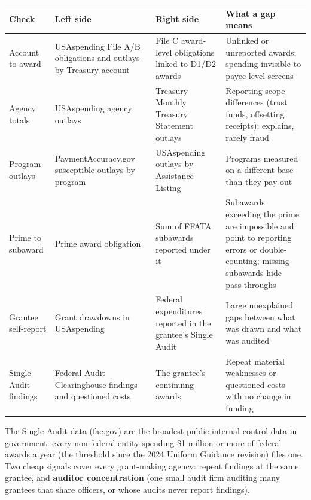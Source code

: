 \documentclass[letterpaper,11pt]{article}
\begin{document}
\begingroup\small\setlength{\tabcolsep}{4pt}\renewcommand{\arraystretch}{1.25}
\begin{longtable}[l]{@{}>{\raggedright\arraybackslash}p{}>{\raggedright\arraybackslash}p{}>{\raggedright\arraybackslash}p{}>{\raggedright\arraybackslash}p{}@{}}
\rowcolor{coolblack}\leavevmode\color{white}\bfseries Check & \leavevmode\color{white}\bfseries Left side & \leavevmode\color{white}\bfseries Right side & \leavevmode\color{white}\bfseries What a gap means \\
\endhead
Account to award & USAspending File A/B obligations and outlays by Treasury account & File C award-level obligations linked to D1/D2 awards & Unlinked or unreported awards; spending invisible to payee-level screens \\
Agency totals & USAspending agency outlays & Treasury Monthly Treasury Statement outlays & Reporting scope differences (trust funds, offsetting receipts); explains, rarely fraud \\
Program outlays & PaymentAccuracy.gov susceptible outlays by program & USAspending outlays by Assistance Listing & Programs measured on a different base than they pay out \\
Prime to subaward & Prime award obligation & Sum of FFATA subawards reported under it & Subawards exceeding the prime are impossible and point to reporting errors or double-counting; missing subawards hide pass-throughs \\
Grantee self-report & Grant drawdowns in USAspending & Federal expenditures reported in the grantee's Single Audit & Large unexplained gaps between what was drawn and what was audited \\
Single Audit findings & Federal Audit Clearinghouse findings and questioned costs & The grantee's continuing awards & Repeat material weaknesses or questioned costs with no change in funding \\
\end{longtable}\endgroup

The Single Audit data (fac.gov) are the broadest public internal-control
data in government: every non-federal entity spending \$1 million or
more of federal awards a year (the threshold since the 2024 Uniform
Guidance revision) files one. Two cheap signals cover every grant-making
agency: repeat findings at the same grantee, and \textbf{auditor
concentration} (one small audit firm auditing many grantees that share
officers, or whose audits never report findings).
\end{document}
